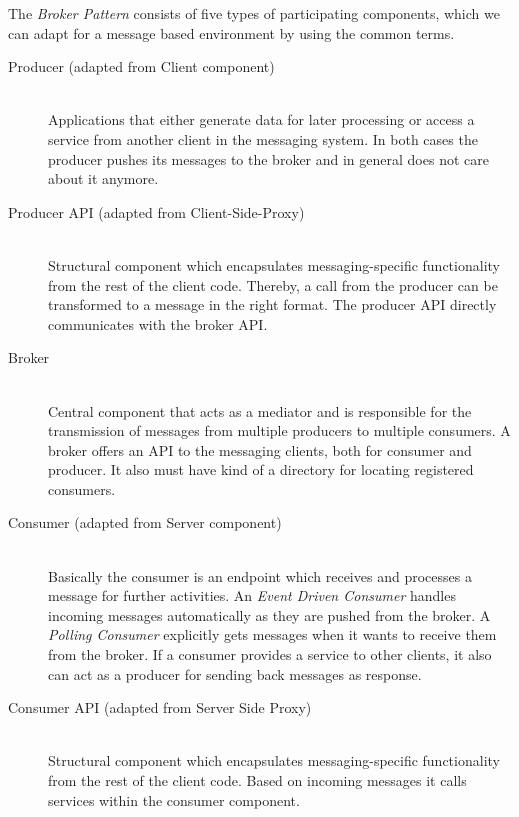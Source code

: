 The \textit{Broker Pattern} consists of five types of participating components,
which we can adapt for a message based environment by using the common terms.

\begin{description}
    \item[Producer (adapted from Client component)] \hfill \\
        {Applications that either generate data for later processing or
        access a service from another client in the messaging system. In both
        cases the producer pushes its messages to the broker and in general does
        not care about it anymore.}
    \item[Producer API (adapted from Client-Side-Proxy)] \hfill \\
        {Structural component which encapsulates messaging-specific
        functionality from the rest of the client code. Thereby, a call from the producer
        can be transformed to a message in the right format. The producer API
        directly communicates with the broker API.}
    \item[Broker] \hfill \\
        {Central component that acts as a mediator and is responsible for the
        transmission of messages from multiple producers to multiple consumers.
        A broker offers an API to the messaging clients, both for consumer and
        producer. It also must have kind of a directory for locating registered
        consumers.} 
    \item[Consumer (adapted from Server component)] \hfill \\
        {Basically the consumer is an endpoint which receives and processes a
            message for further activities. An \textit{Event Driven Consumer}
            handles incoming messages automatically as they are pushed from the
            broker. A \textit{Polling Consumer} explicitly gets messages when it
            wants to receive them from the broker. If a consumer provides a
            service to other clients, it also can act as a producer for sending
            back messages as response.}
    \item[Consumer API (adapted from Server Side Proxy)] \hfill \\
        {Structural component which encapsulates messaging-specific
        functionality from the rest of the client code. Based on incoming
        messages it calls services within the consumer component.}
\end{description}
\newpage
